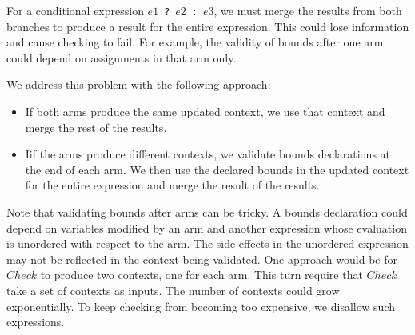 For a conditional expression $e1$~\lstinline+?+~$e2$~\lstinline+:+~$e3$, we must
merge the results from both branches to produce a result for the entire expression.
This could lose information and cause checking to fail. For example,  the validity of bounds after
one arm could depend on assignments in that arm only.

We address this problem with the following approach:
\begin{itemize}
\item  If both arms produce the same updated context, we use that context
and merge the rest of the results.
\item Iif the arms produce different
contexts, we validate bounds declarations at the end of each arm.  We then
use the declared bounds in the updated context for the entire expression
and merge the result of the results.
\end{itemize}

Note that validating bounds after arms can be tricky.
A bounds declaration could depend on variables modified by an arm
and another expression whose evaluation is unordered with respect to the arm.
The side-effects in the unordered expression may not be reflected in the
context being validated.
One approach would be for $Check$ to produce two contexts,
one for each arm. This turn require that $Check$ take a set of contexts as
 inputs.  The number of contexts could grow exponentially.
To keep checking from becoming too expensive, we disallow such expressions.

